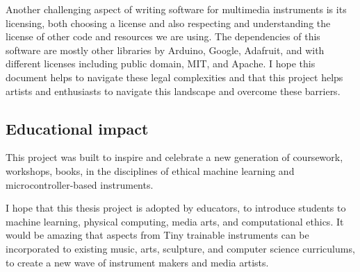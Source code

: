 Another challenging aspect of writing software for multimedia instruments is its licensing, both choosing a license and also respecting and understanding the license of other code and resources we are using. The dependencies of this software are mostly other libraries by Arduino, Google, Adafruit, and with different licenses including public domain, MIT, and Apache. I hope this document helps to navigate these legal complexities and that this project helps artists and enthusiasts to navigate this landscape and overcome these barriers.

\subsection{Educational impact}

This project was built to inspire and celebrate a new generation of coursework, workshops, books, in the disciplines of ethical machine learning and microcontroller-based instruments.

I hope that this thesis project is adopted by educators, to introduce students to machine learning, physical computing, media arts, and computational ethics. It would be amazing that aspects from Tiny trainable instruments can be incorporated to existing music, arts, sculpture, and computer science curriculums, to create a new wave of instrument makers and media artists.
